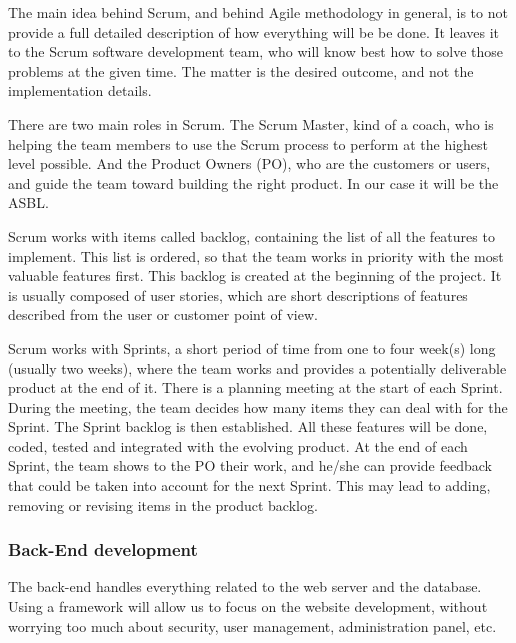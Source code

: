 The main idea behind Scrum, and behind Agile methodology in general, is to not provide a full detailed description of how everything will be be done. It leaves it to the Scrum software development team, who will know best how to solve those problems at the given time. The matter is the desired outcome, and not the implementation details.\newline

There are two main roles in Scrum. The Scrum Master, kind of a coach, who is helping the team members to use the Scrum process to perform at the highest level possible. And the Product Owners (PO), who are the customers or users, and guide the team toward building the right product. In our case it will be the ASBL.\newline

Scrum works with items called backlog, containing the list of all the features to implement. This list is ordered, so that the team works in priority with the most valuable features first. This backlog is created at the beginning of the project. It is usually composed of user stories, which are short descriptions of features described from the user or customer point of view.\newline

Scrum works with Sprints, a short period of time from one to four week(s) long (usually two weeks), where the team works and provides a potentially deliverable product at the end of it. There is a planning meeting at the start of each Sprint. During the meeting, the team decides how many items they can deal with for the Sprint. The Sprint backlog is then established. All these features will be done, coded, tested and integrated with the evolving product. At the end of each Sprint, the team shows to the PO their work, and he/she can provide feedback that could be taken into account for the next Sprint. This may lead to adding, removing or revising items in the product backlog.\newline

\iffalse
\subsubsection{Back-End development}
The back-end handles everything related to the web server and the database. Using a framework will allow us to focus on the website development, without worrying too much about security, user management, administration panel, etc.\newline

